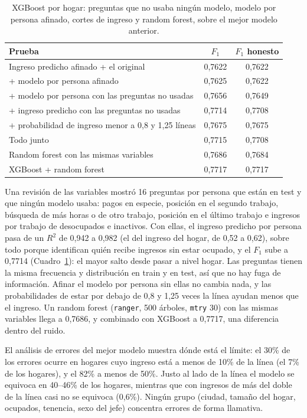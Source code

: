 \documentclass[12pt]{article}
\begin{document}
\begin{table}[H]
  \centering
  \small
  \caption{XGBoost por hogar: preguntas que no usaba ningún modelo, modelo por
    persona afinado, cortes de ingreso y random forest, sobre el mejor modelo
    anterior.}
  \label{tab:mejoras2}
  \begin{tabular}{@{}p{8.6cm}cc@{}}
    \toprule
    Prueba & $F_1$ & $F_1$ honesto \\
    \midrule
    Ingreso predicho afinado + el original & 0,7622 & 0,7622 \\
    + modelo por persona afinado & 0,7625 & 0,7622 \\
    + modelo por persona con las preguntas no usadas & 0,7656 & 0,7649 \\
    + ingreso predicho con las preguntas no usadas & 0,7714 & 0,7708 \\
    + probabilidad de ingreso menor a 0,8 y 1,25 líneas & 0,7675 & 0,7675 \\
    Todo junto & 0,7715 & 0,7708 \\
    Random forest con las mismas variables & 0,7686 & 0,7684 \\
    XGBoost + random forest & 0,7717 & 0,7717 \\
    \bottomrule
  \end{tabular}
\end{table}

Una revisión de las variables mostró 16 preguntas por persona que están en
test y que ningún modelo usaba: pagos en especie, posición en el segundo
trabajo, búsqueda de más horas o de otro trabajo, posición en el último
trabajo e ingresos por trabajo de desocupados e inactivos. Con ellas, el
ingreso predicho por persona pasa de un $R^2$ de 0,942 a 0,982 (el del
ingreso del hogar, de 0,52 a 0,62), sobre todo porque identifican quién
recibe ingresos sin estar ocupado, y el $F_1$ sube a 0,7714
(Cuadro~\ref{tab:mejoras2}): el mayor salto desde pasar a nivel hogar. Las
preguntas tienen la misma frecuencia y distribución en train y en test, así
que no hay fuga de información. Afinar el modelo por persona sin ellas no
cambia nada, y las probabilidades de estar por debajo de 0,8 y 1,25 veces la
línea ayudan menos que el ingreso. Un random forest (\texttt{ranger}, 500
árboles, \texttt{mtry} 30) con las mismas variables llega a 0,7686, y
combinado con XGBoost a 0,7717, una diferencia dentro del ruido.

El análisis de errores del mejor modelo muestra dónde está el límite: el
30\% de los errores ocurre en hogares cuyo ingreso está a menos de 10\% de
la línea (el 7\% de los hogares), y el 82\% a menos de 50\%. Justo al lado
de la línea el modelo se equivoca en 40--46\% de los hogares, mientras que
con ingresos de más del doble de la línea casi no se equivoca (0,6\%).
Ningún grupo (ciudad, tamaño del hogar, ocupados, tenencia, sexo del jefe)
concentra errores de forma llamativa.
\end{document}
